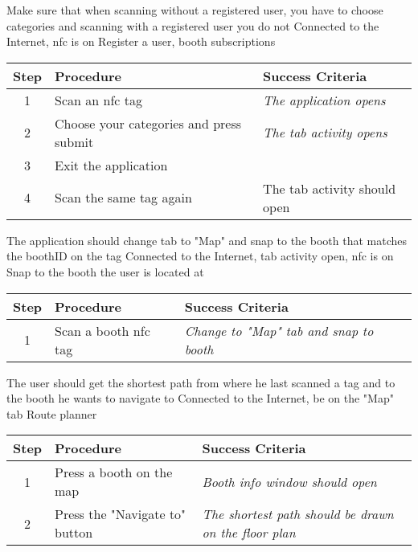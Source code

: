 \testcase
{\casesix}
{Make sure that when scanning without a registered user, you have to choose categories and scanning with a registered user you do not}
{Connected to the Internet, \ac{nfc} is on}
{Register a user, booth subscriptions}

\begin{center}
\begin{tabular}{| c | p{4.6cm} | p{4.6cm} |}
\hline
\textbf{Step} & \textbf{Procedure} & \textbf{Success Criteria}\\
\hline
1 & Scan an \ac{nfc} tag & \textit{The application opens}\\
\hline
2 & Choose your categories and press submit & \textit{The tab activity opens}\\
\hline
3 & Exit the application & \\
4 & Scan the same tag again & The tab activity should open\\
\hline
\end{tabular}
\end{center}

\testcase
{\caseseven}
{The application should change tab to "Map" and snap to the booth that matches the boothID on the tag}
{Connected to the Internet,  tab activity open, \ac{nfc} is on}
{Snap to the booth the user is located at}

\begin{center}
\begin{tabular}{| c | p{4.6cm} | p{4.6cm} |}
\hline
\textbf{Step} & \textbf{Procedure} & \textbf{Success Criteria}\\
\hline
1 & Scan a booth \ac{nfc} tag& \textit{Change to "Map" tab and snap to booth}\\
\hline
\end{tabular}
\end{center}

\testcase
{\caseeight}
{The user should get the shortest path from where he last scanned a tag and to the booth he wants to navigate to}
{Connected to the Internet, be on the "Map" tab}
{Route planner}

\begin{center}
\begin{tabular}{| c | p{4.6cm} | p{4.6cm} |}
\hline
\textbf{Step} & \textbf{Procedure} & \textbf{Success Criteria}\\
\hline
1 & Press a booth on the map & \textit{Booth info window should open}\\
\hline
2 & Press the "Navigate to" button & \textit{The shortest path should be drawn on the floor plan}\\
\hline
\end{tabular}
\end{center}


